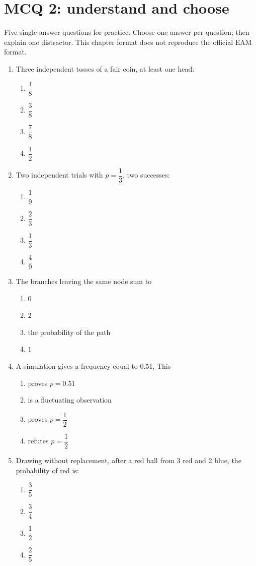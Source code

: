 \endgroup
\begingroup\small
{}\section*{MCQ 2: understand and choose}\label{C05-Q2}
Five single-answer questions for practice. Choose one answer per question; then explain one distractor. This chapter format does not reproduce the official EAM format.
\begin{enumerate}
\item Three independent tosses of a fair coin, at least one head:
\begin{enumerate}[label=\Alph*.,itemsep=2pt]
\item $\dfrac{1}{8}$
\item $\dfrac{3}{8}$
\item $\dfrac{7}{8}$
\item $\dfrac{1}{2}$
\end{enumerate}
\item Two independent trials with $p=\dfrac{1}{3}$, two successes:
\begin{enumerate}[label=\Alph*.,itemsep=2pt]
\item $\dfrac{1}{9}$
\item $\dfrac{2}{3}$
\item $\dfrac{1}{3}$
\item $\dfrac{4}{9}$
\end{enumerate}
\item The branches leaving the same node sum to
\begin{enumerate}[label=\Alph*.,itemsep=2pt]
\item $0$
\item $2$
\item the probability of the path
\item $1$
\end{enumerate}
\item A simulation gives a frequency equal to 0.51. This
\begin{enumerate}[label=\Alph*.,itemsep=2pt]
\item proves $p=0.51$
\item is a fluctuating observation
\item proves $p=\dfrac{1}{2}$
\item refutes $p=\dfrac{1}{2}$
\end{enumerate}
\item Drawing without replacement, after a red ball from 3 red and 2 blue, the probability of red is:
\begin{enumerate}[label=\Alph*.,itemsep=2pt]
\item $\dfrac{3}{5}$
\item $\dfrac{3}{4}$
\item $\dfrac{1}{2}$
\item $\dfrac{2}{5}$
\end{enumerate}
\end{enumerate}
